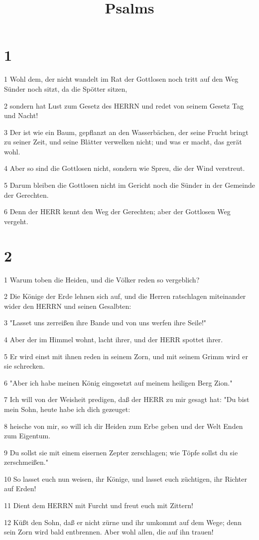 

\title{Psalms}


\chapter{1}

\par 1 Wohl dem, der nicht wandelt im Rat der Gottlosen noch tritt auf den Weg Sünder noch sitzt, da die Spötter sitzen,
\par 2 sondern hat Lust zum Gesetz des HERRN und redet von seinem Gesetz Tag und Nacht!
\par 3 Der ist wie ein Baum, gepflanzt an den Wasserbächen, der seine Frucht bringt zu seiner Zeit, und seine Blätter verwelken nicht; und was er macht, das gerät wohl.
\par 4 Aber so sind die Gottlosen nicht, sondern wie Spreu, die der Wind verstreut.
\par 5 Darum bleiben die Gottlosen nicht im Gericht noch die Sünder in der Gemeinde der Gerechten.
\par 6 Denn der HERR kennt den Weg der Gerechten; aber der Gottlosen Weg vergeht.

\chapter{2}

\par 1 Warum toben die Heiden, und die Völker reden so vergeblich?
\par 2 Die Könige der Erde lehnen sich auf, und die Herren ratschlagen miteinander wider den HERRN und seinen Gesalbten:
\par 3 "Lasset uns zerreißen ihre Bande und von uns werfen ihre Seile!"
\par 4 Aber der im Himmel wohnt, lacht ihrer, und der HERR spottet ihrer.
\par 5 Er wird einst mit ihnen reden in seinem Zorn, und mit seinem Grimm wird er sie schrecken.
\par 6 "Aber ich habe meinen König eingesetzt auf meinem heiligen Berg Zion."
\par 7 Ich will von der Weisheit predigen, daß der HERR zu mir gesagt hat: "Du bist mein Sohn, heute habe ich dich gezeuget:
\par 8 heische von mir, so will ich dir Heiden zum Erbe geben und der Welt Enden zum Eigentum.
\par 9 Du sollst sie mit einem eisernen Zepter zerschlagen; wie Töpfe sollst du sie zerschmeißen."
\par 10 So lasset euch nun weisen, ihr Könige, und lasset euch züchtigen, ihr Richter auf Erden!
\par 11 Dient dem HERRN mit Furcht und freut euch mit Zittern!
\par 12 Küßt den Sohn, daß er nicht zürne und ihr umkommt auf dem Wege; denn sein Zorn wird bald entbrennen. Aber wohl allen, die auf ihn trauen!

